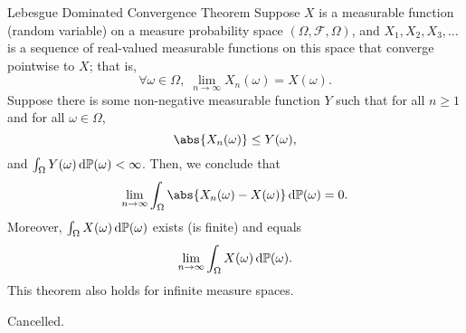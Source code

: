 \begin{Theorem}{Lebesgue Dominated Convergence Theorem}{}
    Suppose $ X $ is a measurable function (random variable) on a measure
    probability space $ (\Omega,\mathcal{F},\Omega) $, and $ X_1,X_2,X_3,\ldots $ is a sequence
    of real-valued measurable functions on this space that converge
    pointwise to $ X $; that is,
    \[ \forall \omega\in\Omega,\; \lim\limits_{{n} \to {\infty}}
        X_n(\omega)=X(\omega). \]
    Suppose there is some non-negative measurable
    function $ Y $ such that for all $ n\ge 1 $ and for all
    $ \omega\in\Omega $,
    \[ \abs{X_n(\omega)}\le Y(\omega), \]
    and $ \int_{\Omega}^{}Y(\omega)\odif{\mathbb{P}(\omega)}<\infty $.
    Then, we conclude that
    \[ \lim\limits_{{n} \to {\infty}}\int_{\Omega}^{}\abs{X_n(\omega)-X(\omega)}\odif{\mathbb{P}(\omega)} =0. \]
    Moreover, $ \int_{\Omega}^{}X(\omega)\odif{\mathbb{P}(\omega)} $
    exists (is finite) and equals
    \[ \lim\limits_{{n} \to {\infty}}\int_{\Omega}^{}X(\omega)\odif{\mathbb{P}(\omega)}. \]
    This theorem also holds for infinite measure spaces.
\end{Theorem}

Cancelled.
